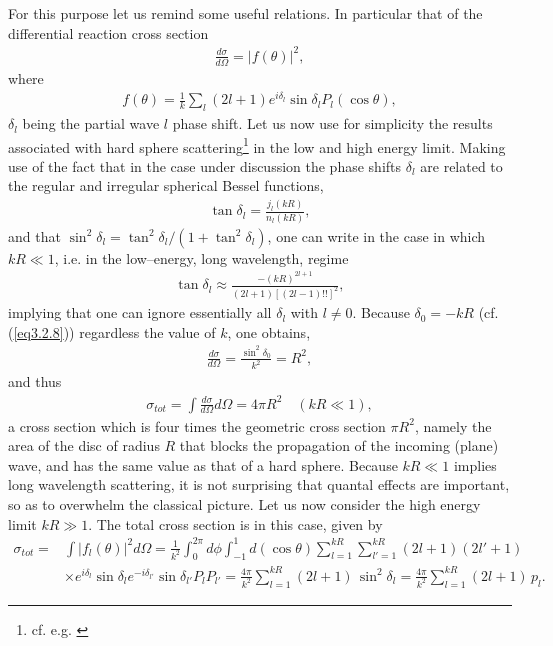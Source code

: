 For this purpose let us remind some useful relations. In particular that of the differential reaction cross section 
\begin{align}
\frac{d\sigma}{d\Omega}=|f(\theta)|^2,
\end{align}
where
\begin{align}
f(\theta)=\frac{1}{k}\sum_l(2l+1)e^{i\delta_l}\sin\delta_lP_l(\cos\theta),
\end{align}
$\delta_l$ being the partial wave $l$ phase shift. Let us now use for simplicity the results associated with hard sphere scattering\footnote{cf. e.g. \cite{Sakurai:94}} in the low and high energy limit. Making use of the fact that in the case under discussion the phase shifts $\delta_l$ are related to the regular and irregular spherical Bessel functions,
\begin{align}\label{eq3.2.8}
\tan\delta_l=\frac{j_l(kR)}{n_l(kR)},
\end{align}
and that $\sin^2\delta_l=\tan^2\delta_l/(1+\tan^2\delta_l)$,  one can write in the case in which $kR\ll1$, i.e. in the low--energy, long wavelength, regime
\begin{align}
\tan\delta_l\approx\frac{-(kR)^{2l+1}}{(2l+1)[(2l-1)!!]^2},
\end{align}
implying that one can ignore essentially all $\delta_l$ with $l\neq0$. Because $\delta_0=-kR$ (cf. (\ref{eq3.2.8})) regardless the value of $k$, one obtains,
\begin{align}
\frac{d\sigma}{d\Omega}=\frac{\sin^2\delta_0}{k^2}=R^2,
\end{align}
and thus
\begin{align}
\sigma_{tot}=\int\frac{d\sigma}{d\Omega}d\Omega=4\pi R^2\quad(kR\ll1),
\end{align}
a cross section which is four times the geometric cross section $\pi R^2$, namely the area of the disc of radius $R$ that blocks the propagation of the incoming (plane) wave, and has the same value as that of a hard sphere. Because $kR\ll1$  
implies long wavelength scattering, it is not surprising that quantal effects are important, so as to overwhelm the classical picture. Let us now consider the high energy limit $kR\gg 1$. The total cross section is in this case, given by
\begin{align}\label{eq3.2.6}
\nonumber\sigma_{tot}=&\int |f_l(\theta)|^2d\Omega=\frac{1}{k^2}\int_0^{2\pi}d\phi\int_{-1}^{1}d(\cos\theta)\sum_{l=1}^{kR}\sum_{l'=1}^{kR}(2l+1)(2l'+1)\\
&\times e^{i\delta_l}\sin\delta_l e^{-i\delta_{l'}}\sin\delta_{l'}P_lP_{l'}=\frac{4\pi}{k^2}\sum_{l=1}^{kR}(2l+1)\,\sin^2\delta_l=\frac{4\pi}{k^2}\sum_{l=1}^{kR}(2l+1)\,p_l.
\end{align}

